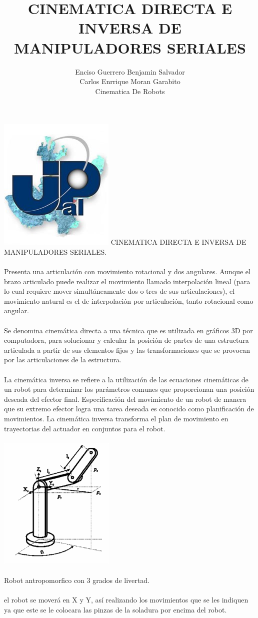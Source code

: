\documentclass[12pt,a4paper]{article}
\author{Enciso Guerrero Benjamin Salvador\\
Carlos Enrrique Moran Garabito\\
Cinematica De Robots }
\title{CINEMATICA DIRECTA E INVERSA DE MANIPULADORES SERIALES}
\begin{document}
\maketitle
\includegraphics[scale=1.8]{upzmgg.jpg} 
\newpage
CINEMATICA DIRECTA E INVERSA DE MANIPULADORES SERIALES.
\\\\
Presenta una articulación con movimiento rotacional y dos angulares. Aunque el brazo articulado puede realizar el movimiento llamado interpolación lineal (para lo cual requiere mover simultáneamente dos o tres de sus articulaciones), el movimiento natural es el de interpolación por articulación, tanto rotacional como angular. \\\\
Se denomina cinemática directa a una técnica que es utilizada en gráficos 3D por computadora, para solucionar y calcular la posición de partes de una estructura articulada a partir de sus elementos fijos y las transformaciones que se provocan por las articulaciones de la estructura. \\\\
La cinemática inversa se refiere a la utilización de las ecuaciones cinemáticas de un robot para determinar los parámetros comunes que proporcionan una posición deseada del efector final. Especificación del movimiento de un robot de manera que su extremo efector logra una tarea deseada es conocido como planificación de movimientos. La cinemática inversa transforma el plan de movimiento en trayectorias del actuador en conjuntos para el robot. \\\\

\includegraphics[scale=1.5]{images.png} 
\\\\
Robot antropomorfico con 3 grados de livertad. \\\\
el robot se moverá en X y Y, así realizando los movimientos que se les indiquen ya que este se le colocara las pinzas de la soladura por encima del robot. 
\end{document}

